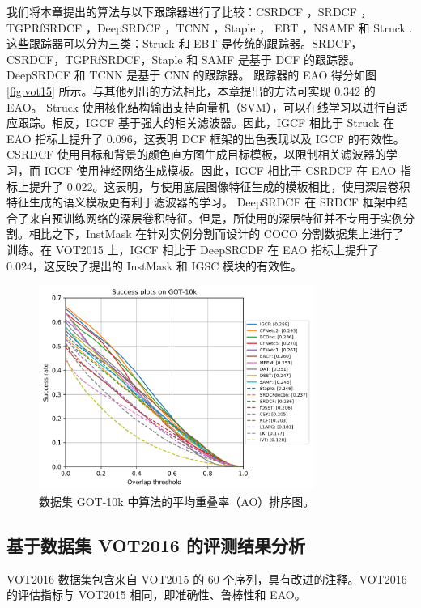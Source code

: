 我们将本章提出的算法与以下跟踪器进行了比较：CSRDCF \cite{Lukezic2017DiscriminativeCF}，SRDCF \cite{Danelljan2015LearningSR}，TGPRfSRDCF \cite{gao2018tracking}，DeepSRDCF \cite{Danelljan2015ConvolutionalFF}，TCNN \cite{nam2016modeling}，Staple \cite{Bertinetto2016StapleC}， EBT \cite{Zhu2016BeyondLS}，NSAMF \cite{Hua2015OnlineOT} 和 Struck \cite{Hare2011StruckSO}.
这些跟踪器可以分为三类：Struck 和 EBT 是传统的跟踪器。SRDCF，CSRDCF，TGPRfSRDCF，Staple 和 SAMF 是基于 DCF 的跟踪器。DeepSRDCF 和 TCNN 是基于 CNN 的跟踪器。
跟踪器的 EAO 得分如图 \ref{fig:vot15} 所示。与其他列出的方法相比，本章提出的方法可实现 0.342 的 EAO。
Struck 使用核化结构输出支持向量机（SVM），可以在线学习以进行自适应跟踪。相反，IGCF 基于强大的相关滤波器。因此，IGCF 相比于 Struck 在 EAO 指标上提升了 0.096，这表明 DCF 框架的出色表现以及 IGCF 的有效性。
CSRDCF 使用目标和背景的颜色直方图生成目标模板，以限制相关滤波器的学习，而 IGCF 使用神经网络生成模板。因此，IGCF 相比于 CSRDCF 在 EAO 指标上提升了 0.022。这表明，与使用底层图像特征生成的模板相比，使用深层卷积特征生成的语义模板更有利于滤波器的学习。
DeepSRDCF 在 SRDCF 框架中结合了来自预训练网络的深层卷积特征。但是，所使用的深层特征并不专用于实例分割。相比之下，InstMask 在针对实例分割而设计的 COCO 分割数据集上进行了训练。在 VOT2015 上，IGCF 相比于 DeepSRCDF 在 EAO 指标上提升了 0.024，这反映了提出的 InstMask 和 IGSC 模块的有效性。

\begin{figure}[t]
    \centering
    \includegraphics[width=0.8\textwidth]{Img/IGCF/got10k/success_plot.png}
    \caption{数据集 GOT-10k \cite{GOT-10k} 中算法的平均重叠率（AO）排序图。}
    \label{fig:IGCF_got10k}
\end{figure}

\subsection{基于数据集 VOT2016 的评测结果分析}
VOT2016 \cite{Kristan2016TheVO} 数据集包含来自 VOT2015 的 60 个序列，具有改进的注释。VOT2016 的评估指标与 VOT2015 相同，即准确性、鲁棒性和 EAO。

